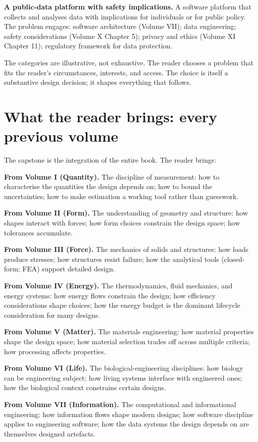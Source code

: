 \textbf{A public-data platform with safety implications.} A software platform that collects and analyses data with implications for individuals or for public policy. The problem engages: software architecture (Volume VII); data engineering; safety considerations (Volume X Chapter 5); privacy and ethics (Volume XI Chapter 11); regulatory framework for data protection.

The categories are illustrative, not exhaustive. The reader chooses a problem that fits the reader's circumstances, interests, and access. The choice is itself a substantive design decision; it shapes everything that follows.

\section{What the reader brings: every previous volume}

The capstone is the integration of the entire book. The reader brings:

\textbf{From Volume I (Quantity).} The discipline of measurement: how to characterise the quantities the design depends on; how to bound the uncertainties; how to make estimation a working tool rather than guesswork.

\textbf{From Volume II (Form).} The understanding of geometry and structure: how shapes interact with forces; how form choices constrain the design space; how tolerances accumulate.

\textbf{From Volume III (Force).} The mechanics of solids and structures: how loads produce stresses; how structures resist failure; how the analytical tools (closed-form; FEA) support detailed design.

\textbf{From Volume IV (Energy).} The thermodynamics, fluid mechanics, and energy systems: how energy flows constrain the design; how efficiency considerations shape choices; how the energy budget is the dominant lifecycle consideration for many designs.

\textbf{From Volume V (Matter).} The materials engineering: how material properties shape the design space; how material selection trades off across multiple criteria; how processing affects properties.

\textbf{From Volume VI (Life).} The biological-engineering disciplines: how biology can be engineering subject; how living systems interface with engineered ones; how the biological context constrains certain designs.

\textbf{From Volume VII (Information).} The computational and informational engineering: how information flows shape modern designs; how software discipline applies to engineering software; how the data systems the design depends on are themselves designed artefacts.

